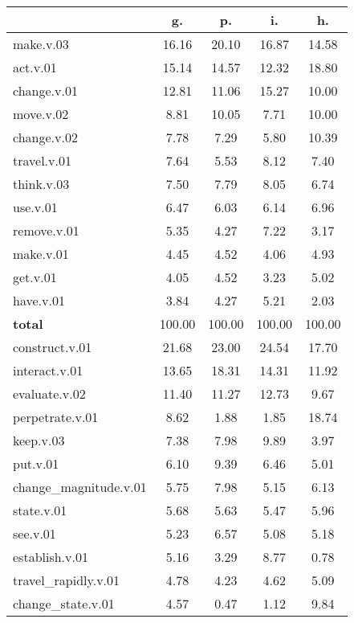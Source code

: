 \begin{table}[h!]
\begin{center}
\begin{tabular}{| l || c | c | c | c |}\hline
 & {\bf g.} & {\bf p.} & {\bf i.} & {\bf h.} \\\hline\hline
make.v.03 & 16.16  & 20.10  & 16.87  & 14.58 \\\hline
act.v.01 & 15.14  & 14.57  & 12.32  & 18.80 \\\hline
change.v.01 & 12.81  & 11.06  & 15.27  & 10.00 \\\hline
move.v.02 & 8.81  & 10.05  & 7.71  & 10.00 \\\hline
change.v.02 & 7.78  & 7.29  & 5.80  & 10.39 \\\hline
travel.v.01 & 7.64  & 5.53  & 8.12  & 7.40 \\\hline
think.v.03 & 7.50  & 7.79  & 8.05  & 6.74 \\\hline
use.v.01 & 6.47  & 6.03  & 6.14  & 6.96 \\\hline
remove.v.01 & 5.35  & 4.27  & 7.22  & 3.17 \\\hline
make.v.01 & 4.45  & 4.52  & 4.06  & 4.93 \\\hline
get.v.01 & 4.05  & 4.52  & 3.23  & 5.02 \\\hline
have.v.01 & 3.84  & 4.27  & 5.21  & 2.03 \\\hline\hline
{{\bf total}} & 100.00  & 100.00  & 100.00  & 100.00 \\\hline\hline\hline
construct.v.01 & 21.68  & 23.00  & 24.54  & 17.70 \\\hline
interact.v.01 & 13.65  & 18.31  & 14.31  & 11.92 \\\hline
evaluate.v.02 & 11.40  & 11.27  & 12.73  & 9.67 \\\hline
perpetrate.v.01 & 8.62  & 1.88  & 1.85  & 18.74 \\\hline
keep.v.03 & 7.38  & 7.98  & 9.89  & 3.97 \\\hline
put.v.01 & 6.10  & 9.39  & 6.46  & 5.01 \\\hline
change\_magnitude.v.01 & 5.75  & 7.98  & 5.15  & 6.13 \\\hline
state.v.01 & 5.68  & 5.63  & 5.47  & 5.96 \\\hline
see.v.01 & 5.23  & 6.57  & 5.08  & 5.18 \\\hline
establish.v.01 & 5.16  & 3.29  & 8.77  & 0.78 \\\hline
travel\_rapidly.v.01 & 4.78  & 4.23  & 4.62  & 5.09 \\\hline
change\_state.v.01 & 4.57  & 0.47  & 1.12  & 9.84 \\\hline\hline

\end{tabular}
\end{center}
\end{table}
